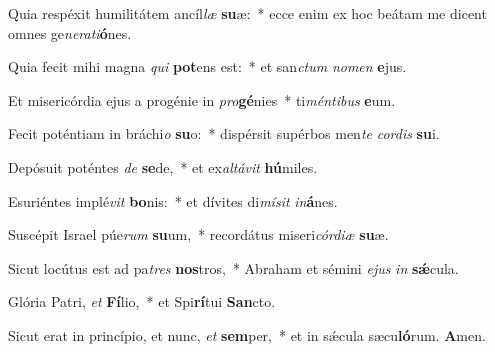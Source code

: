 \item Quia respéxit humilitátem ancíl\textit{læ} \textbf{su}æ:~* ecce enim ex hoc beátam me dicent omnes ge\textit{nerati}\textbf{ó}nes.
\item Quia fecit mihi magna \textit{qui} \textbf{pot}ens est:~* et san\textit{ctum} \textit{nomen} \textbf{e}jus.
\item Et misericórdia ejus a progénie in \textit{pro}\textbf{gé}nies~* ti\textit{méntibus} \textbf{e}um.
\item Fecit poténtiam in bráchi\textit{o} \textbf{su}o:~* dispérsit supérbos men\textit{te} \textit{cordis} \textbf{su}i.
\item Depósuit poténtes \textit{de} \textbf{se}de,~* et ex\textit{altávit} \textbf{hú}miles.
\item Esuriéntes implé\textit{vit} \textbf{bo}nis:~* et dívites di\textit{mísit} \textit{in}\textbf{á}nes.
\item Suscépit Israel púe\textit{rum} \textbf{su}um,~* recordátus miseri\textit{córdiæ} \textbf{su}æ.
\item Sicut locútus est ad pa\textit{tres} \textbf{nos}tros,~* Abraham et sémini \textit{ejus} \textit{in} \textbf{sǽ}cula.
\item Glória Patri, \textit{et} \textbf{Fí}lio,~* et Spi\textbf{rí}tui \textbf{San}cto.
\item Sicut erat in princípio, et nunc, \textit{et} \textbf{sem}per,~* et in sǽcula sæcu\hspace{0.03em}\textbf{ló}rum. \textbf{A}men.
